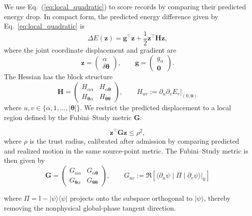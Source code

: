 \documentclass[
  reprint,
  amsmath,
  amssymb,
  aps,
  pra,
  nofootinbib,
  superscriptaddress,
  floatfix
]{revtex4-2}
\newcommand{\ket}[1]{|#1\rangle}
\newcommand{\bra}[1]{\langle #1|}
\begin{document}
We use Eq.~(\ref{eq:local_quadratic}) to score records by comparing their predicted energy drop. In compact form, the predicted energy difference given by Eq.~\eqref{eq:local_quadratic} is
\begin{equation}
\Delta E(\mathbf z)
=
\mathbf g^\top \mathbf z
+
\frac{1}{2}\mathbf z^\top \mathbf H\mathbf z,
\label{eq:compact_local_quadratic}
\end{equation}
where the joint coordinate displacement and gradient are
\begin{equation}
\mathbf z
=
\begin{pmatrix}
\alpha\\
\delta\boldsymbol{\theta}
\end{pmatrix},
\qquad
\mathbf g
=
\begin{pmatrix}
g_\alpha\\
\mathbf 0
\end{pmatrix}.
\end{equation}
The Hessian has the block structure
\begin{equation}
\mathbf H
=
\begin{pmatrix}
H_{\alpha\alpha} & H_{\alpha\boldsymbol\theta}\\
H_{\boldsymbol\theta\alpha} &
H_{\boldsymbol\theta\boldsymbol\theta}
\end{pmatrix}, \qquad
H_{uv}:=\left.\partial_u\partial_vE_r\right|_{(0,\mathbf 0)}
\label{eq:hessian_block_def}
\end{equation}
where \(u,v\in\{\alpha,1,\ldots,|\boldsymbol{\theta}|\}\). We restrict the
predicted displacement to a local region defined by the Fubini--Study metric
\(\mathbf G\):

\begin{equation}
\mathbf z^\top \mathbf G\mathbf z
\le
\rho^2,
\label{eq:fs_trust_region}
\end{equation}
where \(\rho\) is the trust radius, calibrated after admission by comparing
predicted and realized motion in the same source-point metric. The
Fubini--Study metric is then given by
\[
\mathbf G
=
\begin{pmatrix}
G_{\alpha\alpha} & G_{\alpha\boldsymbol\theta}\\
G_{\boldsymbol\theta\alpha} &
G_{\boldsymbol\theta\boldsymbol\theta}
\end{pmatrix}, \qquad G_{uv}:=\Re\!\left[\left.\langle \partial_u\psi \middle| \Pi \middle| \partial_v\psi\rangle\right|_0\right]
\]

where $\Pi=\mathbb I - \ket{\psi}\bra{\psi}$ projects onto the subspace
orthogonal to \(\ket{\psi}\), thereby removing the nonphysical global-phase
tangent direction.
\end{document}

